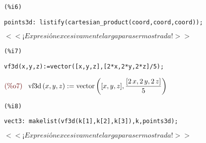 \documentclass{article}
\begin{document}
\noindent
\begin{minipage}[t]{8ex}{\color{red}\bf
\begin{verbatim}
(%i6) 
\end{verbatim}}
\end{minipage}
\begin{minipage}[t]{\textwidth}{\color{blue}
\begin{verbatim}
points3d: listify(cartesian_product(coord,coord,coord));
\end{verbatim}}
\end{minipage}
\begin{math}\displaystyle
 << ¡Expresión excesivamente larga para ser mostrada! >>
\end{math}


\noindent
\begin{minipage}[t]{8ex}{\color{red}\bf
\begin{verbatim}
(%i7) 
\end{verbatim}}
\end{minipage}
\begin{minipage}[t]{\textwidth}{\color{blue}
\begin{verbatim}
vf3d(x,y,z):=vector([x,y,z],[2*x,2*y,2*z]/5);
\end{verbatim}}
\end{minipage}
\begin{math}\displaystyle
\parbox{8ex}{\color{labelcolor}(\%o7) }
\mathrm{vf3d}\left( x,y,z\right) :=\mathrm{vector}\left( [x,y,z],\frac{[2\,x,2\,y,2\,z]}{5}\right) 
\end{math}


\noindent
\begin{minipage}[t]{8ex}{\color{red}\bf
\begin{verbatim}
(%i8) 
\end{verbatim}}
\end{minipage}
\begin{minipage}[t]{\textwidth}{\color{blue}
\begin{verbatim}
vect3: makelist(vf3d(k[1],k[2],k[3]),k,points3d);
\end{verbatim}}
\end{minipage}
\begin{math}\displaystyle
 << ¡Expresión excesivamente larga para ser mostrada! >>
\end{math}
\end{document}

